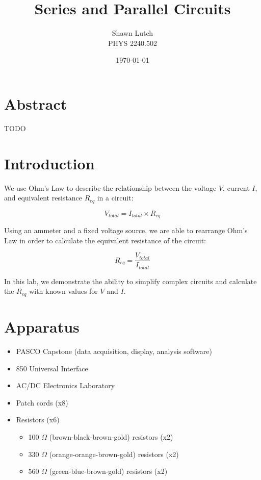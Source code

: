 \documentclass[12pt,letterpaper,titlepage]{report}
\newcommand{\myTitle}{Series and Parallel Circuits}
\newcommand{\myName}{Shawn Lutch}
\newcommand{\myPeriod}{PHYS 2240.502}
\begin{document}


\title{\myTitle{}}
\author{\myName{}\\ \myPeriod{}}
\date{\today}
\maketitle




\section*{Abstract}

TODO



\bigskip
\section*{Introduction}

We use Ohm's Law to describe the relationship between the voltage $V$, current $I$, and equivalent resistance $R_{eq}$ in a circuit:

$$V_{total} = I_{total} \times R_{eq}$$

Using an ammeter and a fixed voltage source, we are able to rearrange Ohm's Law in order to calculate the equivalent resistance of the circuit:

$$R_{eq} = \frac{ V_{total} }{ I_{total} }$$

In this lab, we demonstrate the ability to simplify complex circuits and calculate the $R_{eq}$ with known values for $V$ and $I$.





\bigskip
\section*{Apparatus}

\begin{itemize}
	\item PASCO Capstone (data acquisition, display, analysis software)
	\item 850 Universal Interface
	\item AC/DC Electronics Laboratory
	\item Patch cords (x8)
	\item Resistors (x6)
		\begin{itemize}
			\item 100 $\Omega$ (brown-black-brown-gold) resistors (x2)
			\item 330 $\Omega$ (orange-orange-brown-gold) resistors (x2)
			\item 560 $\Omega$ (green-blue-brown-gold) resistors (x2)
		\end{itemize}
\end{itemize}
\end{document}
